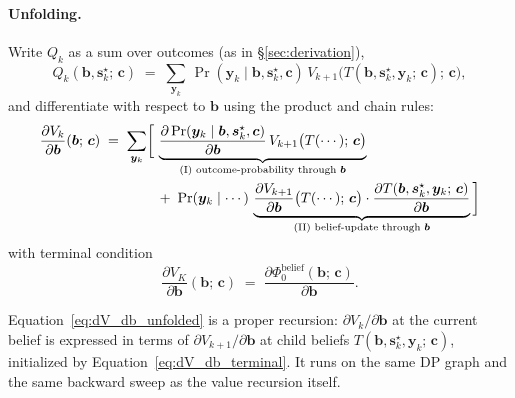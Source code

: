 \documentclass[11pt]{article}
\newcommand{\bc}{\bm{c}}
\newcommand{\by}{\bm{y}}
\newcommand{\bs}{\bm{s}}
\newcommand{\bb}{\bm{b}}
\begin{document}
\paragraph{Unfolding.}  Write $Q_k$ as a sum over outcomes (as in §\ref{sec:derivation}),
\begin{equation}
Q_k(\bb, \bs_k^\star;\, \bc) \;=\; \sum_{\by_k}\, \Pr(\by_k \mid \bb, \bs_k^\star, \bc)\, V_{k+1}\bigl(T(\bb, \bs_k^\star, \by_k;\, \bc);\, \bc\bigr),
\end{equation}
and differentiate with respect to $\bb$ using the product and chain rules:
\begin{align}
\frac{\partial V_k}{\partial \bb}(\bb;\, \bc) \;=\; \sum_{\by_k} \biggl[\,
&\underbrace{\frac{\partial \Pr(\by_k \mid \bb, \bs_k^\star, \bc)}{\partial \bb}\, V_{k+1}\bigl(T(\cdots);\, \bc\bigr)}_{\text{(I) outcome-probability through }\bb} \notag\\
& +\; \Pr(\by_k \mid \cdots)\, \underbrace{\frac{\partial V_{k+1}}{\partial \bb}\bigl(T(\cdots);\, \bc\bigr) \cdot \frac{\partial T(\bb, \bs_k^\star, \by_k;\, \bc)}{\partial \bb}}_{\text{(II) belief-update through }\bb}\, \biggr]
\label{eq:dV_db_unfolded}
\end{align}
with terminal condition
\begin{equation}
\frac{\partial V_K}{\partial \bb}(\bb;\, \bc) \;=\; \frac{\partial \Phi_0^{\mathrm{belief}}(\bb;\, \bc)}{\partial \bb}.
\label{eq:dV_db_terminal}
\end{equation}

Equation~\eqref{eq:dV_db_unfolded} is a proper recursion: $\partial V_k / \partial \bb$ at the current belief is expressed in terms of $\partial V_{k+1} / \partial \bb$ at child beliefs $T(\bb, \bs_k^\star, \by_k;\, \bc)$, initialized by Equation~\eqref{eq:dV_db_terminal}.  It runs on the same DP graph and the same backward sweep as the value recursion itself.
\end{document}
